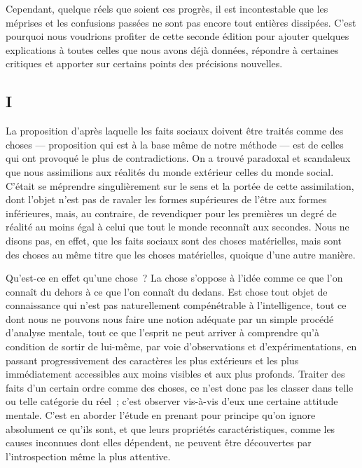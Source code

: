 \documentclass[french,twoside]{book} %
\begin{document}
Cependant, quelque réels que soient ces progrès, il est incontestable que les méprises et les confusions passées ne sont pas encore tout entières dissipées. C’est pourquoi nous voudrions profiter de cette seconde édition pour ajouter quelques explications à toutes celles que nous avons déjà données, répondre à certaines critiques et apporter sur certains points des précisions nouvelles.\par
\subsection[{I}]{I}
\noindent La proposition d’après laquelle les faits sociaux doivent être traités comme des choses — proposition qui est à la base même de notre méthode — est de celles qui ont provoqué le plus de contradictions. On a trouvé paradoxal et scandaleux que nous assimilions aux réalités du monde extérieur celles du monde social. C’était se méprendre singulièrement sur le sens et la portée de cette assimilation, dont l’objet n’est pas de ravaler les formes supérieures de l’être aux formes inférieures, mais, au contraire, de revendiquer pour les premières un degré de réalité au moins égal à celui que tout le monde reconnaît aux secondes. Nous ne disons pas, en effet, que les faits sociaux sont des choses matérielles, mais sont des choses au même titre que les choses matérielles, quoique d’une autre manière.\par
Qu’est-ce en effet qu’une chose ? La chose s’oppose à l’idée comme ce que l’on connaît du dehors à ce que l’on connaît du dedans. Est chose tout objet de connaissance qui n’est pas naturellement compénétrable à l’intelligence, tout ce dont nous ne pouvons nous faire une notion adéquate par un simple procédé d’analyse mentale, tout ce que l’esprit ne peut arriver à comprendre qu’à condition de sortir de lui-même, par voie d’observations et d’expérimentations, en passant progressivement des caractères les plus extérieurs et les plus immédiatement accessibles aux moins visibles et aux plus profonds. Traiter des faits d’un certain ordre comme des choses, ce n’est donc pas les classer dans telle ou telle catégorie du réel ; c’est observer vis-à-vis d’eux une certaine attitude mentale. C’est en aborder l’étude en prenant pour principe qu’on ignore absolument ce qu’ils sont, et que leurs propriétés caractéristiques, comme les causes inconnues dont elles dépendent, ne peuvent être découvertes par l’introspection même la plus attentive.\par
\end{document}
